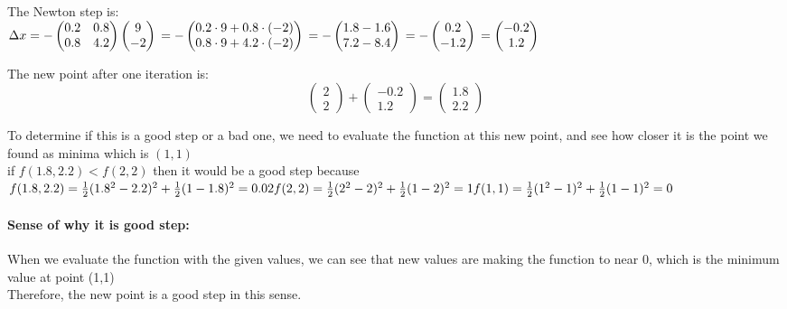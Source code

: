\documentclass[12pt]{article}
\begin{document}
The Newton step is:\\
$
\Delta x = - \begin{pmatrix}
0.2 & 0.8 \\
0.8 & 4.2
\end{pmatrix} \begin{pmatrix}
9 \\
-2
\end{pmatrix}\\
= - \begin{pmatrix}
 0.2 \cdot 9 + 0.8 \cdot (-2) \\
 0.8 \cdot 9+ 4.2\cdot (-2)
\end{pmatrix}\\
= - \begin{pmatrix}
1.8 -1.6 \\
7.2 -8.4
\end{pmatrix}\\
= - \begin{pmatrix}
0.2 \\
-1.2
\end{pmatrix}\\
= \begin{pmatrix}
-0.2 \\
1.2
\end{pmatrix}
$

The new point after one iteration is:
\[
\begin{pmatrix}
2 \\
2
\end{pmatrix}
+ \begin{pmatrix}
-0.2 \\
1.2
\end{pmatrix}
= \begin{pmatrix}
1.8\\
2.2
\end{pmatrix}
\]

To determine if this is a good step or a bad one, we need to evaluate the function at this new point,
and see how closer it is the point we found as minima which is \((1,1)\)\\
if \(f(1.8,2.2) < f(2,2)\) then it would be a good step because\\
\(
    f(1.8,2.2) = \frac{1}{2}(1.8^2 - 2.2)^2 + \frac{1}{2}(1 - 1.8)^2 = 0.02 \\
    f(2,2) = \frac{1}{2}(2^2 - 2)^2 + \frac{1}{2}(1 - 2)^2 = 1\\
    f(1,1) = \frac{1}{2}(1^2 - 1)^2 + \frac{1}{2}(1 - 1)^2 = 0
    \)
\paragraph*{Sense of why it is good step: }When we evaluate the function with the given values, we can see that new values are making the function to near 0, which is the minimum value at point (1,1) \\
Therefore, the new point is a good step in this sense.
\end{document}
